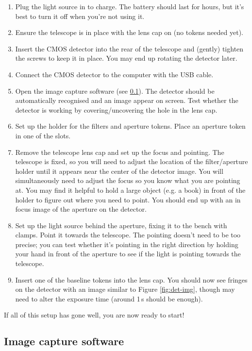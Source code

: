 \documentclass[11pt]{article}
\begin{document}
\begin{enumerate}
    \item Plug the light source in to charge. The battery should last for hours, but it's best to turn it off when you're not using it.
    \item Ensure the telescope is in place with the lens cap on (no tokens needed yet).
    \item Insert the CMOS detector into the rear of the telescope and (gently) tighten the screws to keep it in place. You may end up rotating the detector later.
    \item Connect the CMOS detector to the computer with the USB cable.
    \item Open the image capture software (see \ref{sec:software}). The detector should be automatically recognised and an image appear on screen. Test whether the detector is working by covering/uncovering the hole in the lens cap.
    \item Set up the holder for the filters and aperture tokens. Place an aperture token in one of the slots.
    \item Remove the telescope lens cap and set up the focus and pointing. The telescope is fixed, so you will need to adjust the location of the filter/aperture holder until it appears near the center of the detector image. You will simultaneously need to adjust the focus so you know what you are pointing at. You may find it helpful to hold a large object (e.g. a book) in front of the holder to figure out where you need to point. You should end up with an in focus image of the aperture on the detector.
    \item Set up the light source behind the aperture, fixing it to the bench with clamps. Point it towards the telescope. The pointing doesn't need to be too precise; you can test whether it's pointing in the right direction by holding your hand in front of the aperture to see if the light is pointing towards the telescope.
    \item Insert one of the baseline tokens into the lens cap. You should now see fringes on the detector with an image similar to Figure \ref{fig:det-img}, though may need to alter the exposure time (around 1\,s should be enough).
\end{enumerate}

If all of this setup has gone well, you are now ready to start!

\subsection{Image capture software}\label{sec:software}
\end{document}

